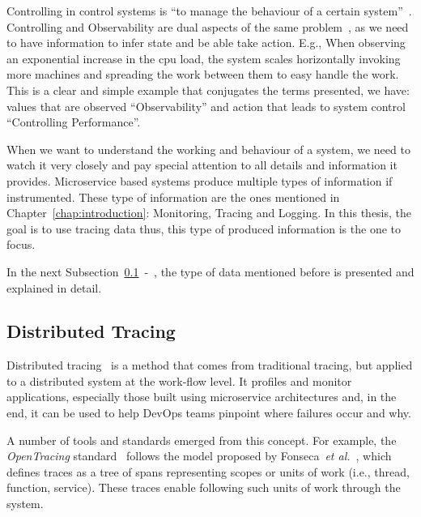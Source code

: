 Controlling in control systems is ``to manage the behaviour of a certain system''~\cite{control_systems}. Controlling and Observability are dual aspects of the same problem~\cite{observability}, as we need to have information to infer state and be able take action. E.g., When observing an exponential increase in the \gls{cpu} load, the system scales horizontally invoking more machines and spreading the work between them to easy handle the work. This is a clear and simple example that conjugates the terms presented, we have: values that are observed ``Observability'' and action that leads to system control ``Controlling Performance''.

When we want to understand the working and behaviour of a system, we need to watch it very closely and pay special attention to all details and information it provides. Microservice based systems produce multiple types of information if instrumented. These type of information are the ones mentioned in Chapter~\ref{chap:introduction}: Monitoring, Tracing and Logging. In this thesis, the goal is to use tracing data thus, this type of produced information is the one to focus.

In the next Subsection~\ref{subsec:distributed_tracing}~-~, the type of data mentioned before is presented and explained in detail.

\subsection{Distributed Tracing}
\label{subsec:distributed_tracing}


Distributed tracing~\cite{Sambasivan2016} is a method that comes from traditional tracing, but applied to a distributed system at the work-flow level. It profiles and monitor applications, especially those built using microservice architectures and, in the end, it can be used to help DevOps teams pinpoint where failures occur and why.

A number of tools and standards emerged from this concept. For example, the \emph{OpenTracing} standard~\cite{open_tracing_data_model_specification} follows the model proposed by Fonseca~\textit{et al.}~\cite{fonseca2007x}, which defines traces as a tree of spans representing scopes or units of work (i.e., thread, function, service). These traces enable following such units of work through the system.


